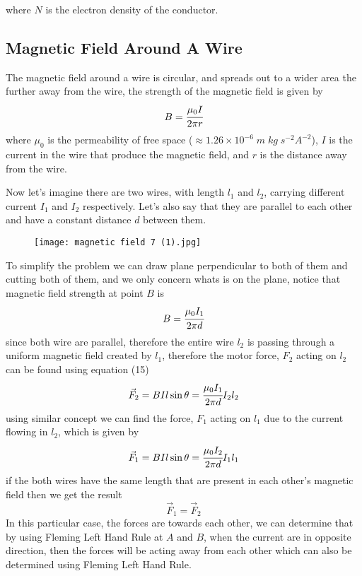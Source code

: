 \documentclass{article}
\begin{document}
where $N$ is the electron density of the conductor.

 \subsection{Magnetic Field Around A Wire}


The magnetic field around a wire is circular, and spreads out to a wider area the further away from the wire, the strength of the magnetic field is given by
$$B=\cfrac{\mu_0I}{2\pi r}$$
where $\mu_0$ is the permeability of free space ($\approx 1.26\times 10^{-6}\;m \; kg \; s^{-2}A^{-2}$), $I$ is the current in the wire that produce the magnetic field, and $r$ is the distance away from the wire.

Now let's imagine there are two wires, with length $l_1$ and $l_2$, carrying different current $I_1$ and $I_2$ respectively. Let's also say that they are parallel to each other and have a constant distance $d$ between them.  

\begin{figure}[H]
    \centering
    \texttt{[image: magnetic field 7 (1).jpg]}
\end{figure}

To simplify the problem we can draw plane perpendicular to both of them and cutting both of them, and we only concern whats is on the plane, notice that magnetic field strength at point $B$ is 
$$B=\cfrac{\mu_0I_1}{2\pi d}$$
since both wire are parallel, therefore the entire wire $l_2$ is passing through a uniform magnetic field created by $l_1$, therefore the motor force, $F_2$ acting on $l_2$ can be found using equation (15)
$$\vec{F}_2=BIl\sin\theta=\cfrac{\mu_0I_1}{2\pi d}I_2l_2$$
using similar concept we can find the force, $F_1$ acting on $l_1$ due to the current flowing in $l_2$, which is given by 
$$\vec{F}_1=BIl\sin\theta=\cfrac{\mu_0I_2}{2\pi d}I_1l_1$$
if the both wires have the same length that are present in each other's magnetic field then we get the result 
    $$\vec{F}_1=\vec{F}_2$$
In this particular case, the forces are towards each other, we can determine that by using Fleming Left Hand Rule at $A$ and $B$, when the current are in opposite direction, then the forces will be acting away from each other which can also be determined using  Fleming Left Hand Rule.

\end{document}
